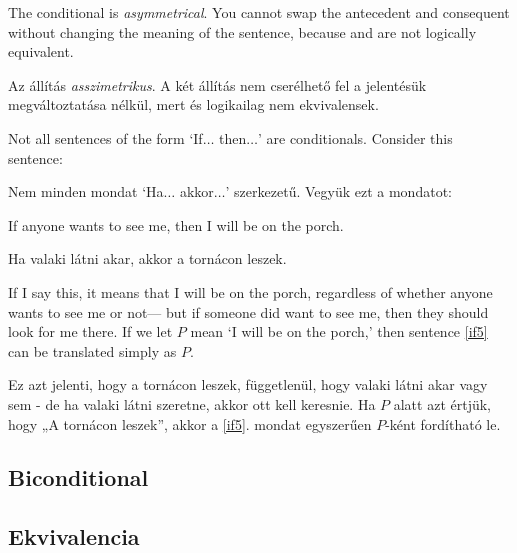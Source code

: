 The conditional is \emph{asymmetrical}. You cannot swap the antecedent and consequent without changing the meaning of the sentence, because \eif{} and \eif{} are not logically equivalent.

Az állítás \emph{asszimetrikus}. A két állítás nem cserélhető fel a jelentésük megváltoztatása nélkül, mert \eif{} és \eif{} logikailag nem ekvivalensek.


Not all sentences of the form `If$\ldots$ then$\ldots$' are conditionals. Consider this sentence:

Nem minden mondat `Ha$\ldots$ akkor$\ldots$' szerkezetű. Vegyük ezt a mondatot:

\begin{earg}
\item[\ex{if5}] If anyone wants to see me, then I will be on the porch.
\end{earg}

\begin{earg}
\item[\ex{if5}] Ha valaki látni akar, akkor a tornácon leszek.
\end{earg}

If I say this, it means that I will be on the porch, regardless of whether anyone wants to see me or not--- but if someone did want to see me, then they should look for me there. If we let $P$ mean `I will be on the porch,' then sentence \ref{if5} can be translated simply as $P$.

Ez azt jelenti, hogy a tornácon leszek, függetlenül, hogy valaki látni akar vagy sem - de ha valaki látni szeretne, akkor ott kell keresnie. Ha $P$ alatt azt értjük, hogy „A tornácon leszek”, akkor a \ref{if5}. mondat egyszerűen $P$-ként fordítható le.



\subsection*{Biconditional}

\subsection{Ekvivalencia}

